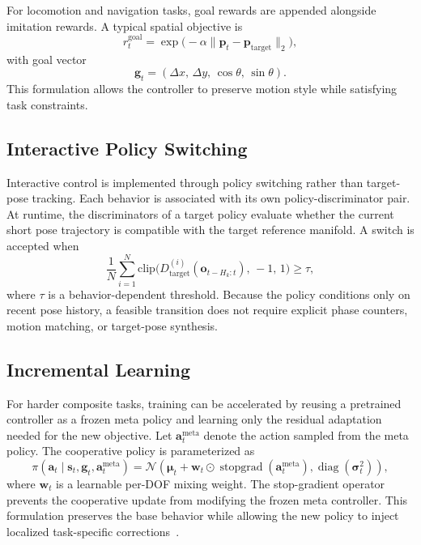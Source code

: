 For locomotion and navigation tasks, goal rewards are appended alongside imitation rewards. A typical spatial objective is
\[
    r_t^{\text{goal}} = \exp\!\bigl(-\alpha\|\mathbf{p}_t - \mathbf{p}_{\text{target}}\|_2\bigr),
\]
with goal vector
\[
    \mathbf{g}_t = (\Delta x,\, \Delta y,\, \cos\theta,\, \sin\theta).
\]
This formulation allows the controller to preserve motion style while satisfying task constraints.

\subsection{Interactive Policy Switching}
\label{sec:policy_switch}

Interactive control is implemented through policy switching rather than target-pose tracking. Each behavior is associated with its own policy-discriminator pair. At runtime, the discriminators of a target policy evaluate whether the current short pose trajectory is compatible with the target reference manifold. A switch is accepted when
\[
    \frac{1}{N}\sum_{i=1}^{N}
    \mathrm{clip}\!\bigl(D^{(i)}_{\text{target}}(\mathbf{o}_{t-H_k:t}),\, -1,\, 1\bigr) \ge \tau,
\]
where $\tau$ is a behavior-dependent threshold. Because the policy conditions only on recent pose history, a feasible transition does not require explicit phase counters, motion matching, or target-pose synthesis.

\subsection{Incremental Learning}
\label{sec:incremental}

For harder composite tasks, training can be accelerated by reusing a pretrained controller as a frozen meta policy and learning only the residual adaptation needed for the new objective. Let $\mathbf{a}_t^{\text{meta}}$ denote the action sampled from the meta policy. The cooperative policy is parameterized as
\[
    \pi(\mathbf{a}_t \mid \mathbf{s}_t,\mathbf{g}_t,\mathbf{a}_t^{\text{meta}})
    =
    \mathcal{N}\!\left(
        \boldsymbol{\mu}_t + \mathbf{w}_t \odot \operatorname{stopgrad}(\mathbf{a}_t^{\text{meta}}),
        \operatorname{diag}(\boldsymbol{\sigma}_t^2)
    \right),
\]
where $\mathbf{w}_t$ is a learnable per-DOF mixing weight. The stop-gradient operator prevents the cooperative update from modifying the frozen meta controller. This formulation preserves the base behavior while allowing the new policy to inject localized task-specific corrections~\cite{composite2023}.
